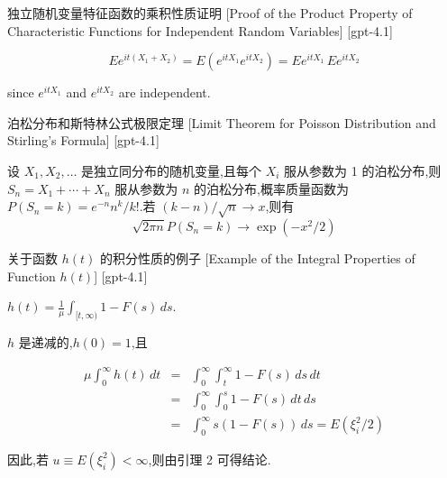 \documentclass[UTF8]{ctexart}
\begin{document}
    
    
    \begin{prf}
        {独立随机变量特征函数的乘积性质证明}
        [Proof of the Product Property of Characteristic Functions for Independent Random Variables]
        [gpt-4.1]
        
\[
E e^{i t (X_{1} + X_{2})} = E (e^{i t X_{1}} e^{i t X_{2}}) = E e^{i t X_{1}} \, E e^{i t X_{2}}
\]

since $e^{i t X_{1}}$ and $e^{i t X_{2}}$ are independent.

    \end{prf}
    
    
    
    \begin{thm}
        {泊松分布和斯特林公式极限定理}
        [Limit Theorem for Poisson Distribution and Stirling's Formula]
        [gpt-4.1]
        
设 $X_1, X_2, \dots$ 是独立同分布的随机变量,且每个 $X_i$ 服从参数为 1 的泊松分布,则 $S_n = X_1 + \cdots + X_n$ 服从参数为 $n$ 的泊松分布,概率质量函数为 $P(S_n = k) = e^{-n} n^{k} / k!$.若 $(k - n)/\sqrt{n} \to x$,则有
\[
\sqrt{2\pi n} P(S_n = k) \to \exp(-x^2/2)
\]

    \end{thm}
    
    
    
    \begin{xmp}
        {关于函数 $h(t)$ 的积分性质的例子}
        [Example of the Integral Properties of Function $h(t)$]
        [gpt-4.1]
        
$h(t) = \frac{1}{\mu} \int_{[t,\infty)} 1 - F(s)\, ds$.

$h$ 是递减的,$h(0) = 1$,且

\[
\begin{array}{rcl}
\mu \int_{0}^{\infty} h(t)\, dt &=& \int_{0}^{\infty} \int_{t}^{\infty} 1 - F(s)\, ds\, dt \\
&=& \int_{0}^{\infty} \int_{0}^{s} 1 - F(s)\, dt\, ds \\
&=& \int_{0}^{\infty} s (1 - F(s))\, ds = E(\xi_i^2/2)
\end{array}
\]

因此,若 $
u \equiv E(\xi_i^2) < \infty$,则由引理 2 可得结论.

    \end{xmp}
    
\end{document}
